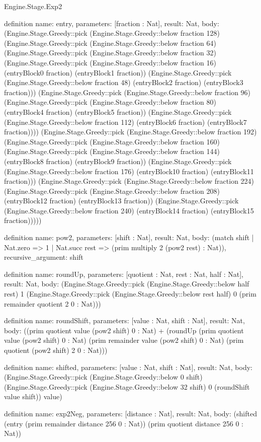 \begin{lexlean}{Engine.Stage.Exp2}
\begin{semanticmodule}
definition{
  name: entry,
  parameters: [fraction : Nat],
  result: Nat,
  body: (Engine.Stage.Greedy::pick (Engine.Stage.Greedy::below fraction 128) (Engine.Stage.Greedy::pick (Engine.Stage.Greedy::below fraction 64) (Engine.Stage.Greedy::pick (Engine.Stage.Greedy::below fraction 32) (Engine.Stage.Greedy::pick (Engine.Stage.Greedy::below fraction 16) (entryBlock0 fraction) (entryBlock1 fraction)) (Engine.Stage.Greedy::pick (Engine.Stage.Greedy::below fraction 48) (entryBlock2 fraction) (entryBlock3 fraction))) (Engine.Stage.Greedy::pick (Engine.Stage.Greedy::below fraction 96) (Engine.Stage.Greedy::pick (Engine.Stage.Greedy::below fraction 80) (entryBlock4 fraction) (entryBlock5 fraction)) (Engine.Stage.Greedy::pick (Engine.Stage.Greedy::below fraction 112) (entryBlock6 fraction) (entryBlock7 fraction)))) (Engine.Stage.Greedy::pick (Engine.Stage.Greedy::below fraction 192) (Engine.Stage.Greedy::pick (Engine.Stage.Greedy::below fraction 160) (Engine.Stage.Greedy::pick (Engine.Stage.Greedy::below fraction 144) (entryBlock8 fraction) (entryBlock9 fraction)) (Engine.Stage.Greedy::pick (Engine.Stage.Greedy::below fraction 176) (entryBlock10 fraction) (entryBlock11 fraction))) (Engine.Stage.Greedy::pick (Engine.Stage.Greedy::below fraction 224) (Engine.Stage.Greedy::pick (Engine.Stage.Greedy::below fraction 208) (entryBlock12 fraction) (entryBlock13 fraction)) (Engine.Stage.Greedy::pick (Engine.Stage.Greedy::below fraction 240) (entryBlock14 fraction) (entryBlock15 fraction)))))
}

definition{
  name: pow2,
  parameters: [shift : Nat],
  result: Nat,
  body: (match shift | Nat.zero => 1 | Nat.succ rest => (prim multiply 2 (pow2 rest) : Nat)),
  recursive_argument: shift
}

definition{
  name: roundUp,
  parameters: [quotient : Nat, rest : Nat, half : Nat],
  result: Nat,
  body: (Engine.Stage.Greedy::pick (Engine.Stage.Greedy::below half rest) 1 (Engine.Stage.Greedy::pick (Engine.Stage.Greedy::below rest half) 0 (prim remainder quotient 2 0 : Nat)))
}

definition{
  name: roundShift,
  parameters: [value : Nat, shift : Nat],
  result: Nat,
  body: ((prim quotient value (pow2 shift) 0 : Nat) + (roundUp (prim quotient value (pow2 shift) 0 : Nat) (prim remainder value (pow2 shift) 0 : Nat) (prim quotient (pow2 shift) 2 0 : Nat)))
}

definition{
  name: shifted,
  parameters: [value : Nat, shift : Nat],
  result: Nat,
  body: (Engine.Stage.Greedy::pick (Engine.Stage.Greedy::below 0 shift) (Engine.Stage.Greedy::pick (Engine.Stage.Greedy::below 32 shift) 0 (roundShift value shift)) value)
}

definition{
  name: exp2Neg,
  parameters: [distance : Nat],
  result: Nat,
  body: (shifted (entry (prim remainder distance 256 0 : Nat)) (prim quotient distance 256 0 : Nat))
}
\end{semanticmodule}
\end{lexlean}
